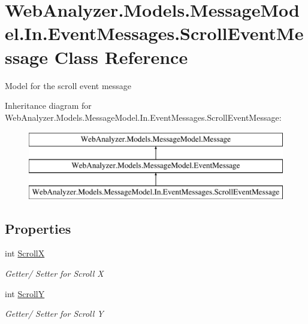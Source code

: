\hypertarget{class_web_analyzer_1_1_models_1_1_message_model_1_1_in_1_1_event_messages_1_1_scroll_event_message}{}\section{Web\+Analyzer.\+Models.\+Message\+Model.\+In.\+Event\+Messages.\+Scroll\+Event\+Message Class Reference}
\label{class_web_analyzer_1_1_models_1_1_message_model_1_1_in_1_1_event_messages_1_1_scroll_event_message}


Model for the scroll event message  


Inheritance diagram for Web\+Analyzer.\+Models.\+Message\+Model.\+In.\+Event\+Messages.\+Scroll\+Event\+Message\+:\begin{figure}[H]
\begin{center}
\leavevmode
\includegraphics[height=3.000000cm]{class_web_analyzer_1_1_models_1_1_message_model_1_1_in_1_1_event_messages_1_1_scroll_event_message}
\end{center}
\end{figure}
\subsection*{Properties}
\begin{DoxyCompactItemize}
\item 
int \hyperlink{class_web_analyzer_1_1_models_1_1_message_model_1_1_in_1_1_event_messages_1_1_scroll_event_message_a4cee20f8724b3bff5aeca63bc6f3ac83}{Scroll\+X}
\begin{DoxyCompactList}\small\item\em Getter/ Setter for Scroll X \end{DoxyCompactList}\item 
int \hyperlink{class_web_analyzer_1_1_models_1_1_message_model_1_1_in_1_1_event_messages_1_1_scroll_event_message_ab7c3211d465e80a5d8f1cf40a0a690ff}{Scroll\+Y}
\begin{DoxyCompactList}\small\item\em Getter/ Setter for Scroll Y \end{DoxyCompactList}\end{DoxyCompactItemize}
